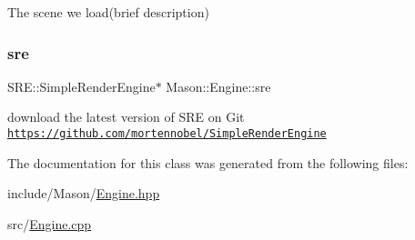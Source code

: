 The scene we load(brief description) 

\hypertarget{class_mason_1_1_engine_a8b5ac2d43f0b366ff51c0908fe581f17}{}\label{class_mason_1_1_engine_a8b5ac2d43f0b366ff51c0908fe581f17} 
\subsubsection{\texorpdfstring{sre}{sre}}
{\footnotesize\ttfamily S\+R\+E\+::\+Simple\+Render\+Engine$\ast$ Mason\+::\+Engine\+::sre}

download the latest version of S\+RE on Git \href{https://github.com/mortennobel/SimpleRenderEngine}{\tt https\+://github.\+com/mortennobel/\+Simple\+Render\+Engine} 

The documentation for this class was generated from the following files\+:\begin{DoxyCompactItemize}
\item 
include/\+Mason/\hyperlink{_engine_8hpp}{Engine.\+hpp}\item 
src/\hyperlink{_engine_8cpp}{Engine.\+cpp}\end{DoxyCompactItemize}
